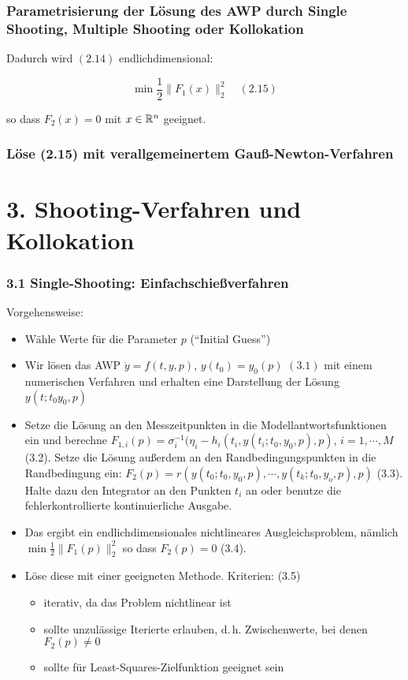 \subsection*{Parametrisierung der Lösung des AWP durch Single Shooting, Multiple Shooting oder Kollokation}

Dadurch wird $(2.14)$ endlichdimensional:

\[ \min \frac 12 \|F_1(x)\|_2^2 \quad (2.15)\]

so dass $F_2(x) = 0$ mit $x \in \mathbb{R}^n$ geeignet.

\subsection*{Löse (2.15) mit verallgemeinertem Gauß-Newton-Verfahren}

\chapter*{3. Shooting-Verfahren und Kollokation}

\subsection*{3.1 Single-Shooting: Einfachschießverfahren}


Vorgehensweise:
\begin{itemize}
\item Wähle Werte für die Parameter $p$ ("`Initial Guess"')
\item Wir lösen das AWP $\dot y = f(t,y,p)$, $y(t_0) = y_0(p)$ $(3.1)$ mit einem numerischen Verfahren und erhalten eine Darstellung der Lösung $y(t; t_0 y_0, p)$
\item Setze die Lösung an den Messzeitpunkten in die Modellantwortsfunktionen ein und berechne $F_{1,i}(p) = \sigma_i^{-1}(\eta_i - h_i(t_i, y(t_i; t_0, y_0, p), p)$, $i=1,\cdots,M$ (3.2). Setze die Lösung außerdem an den Randbedingungspunkten in die Randbedingung ein: $F_2(p) = r(y(t_0; t_0, y_0, p), \cdots, y(t_k; t_0, y_o, p), p)$ (3.3). Halte dazu den Integrator an den Punkten $t_i$ an oder benutze die fehlerkontrollierte kontinuierliche Ausgabe.
\item Das ergibt ein endlichdimensionales nichtlineares Ausgleichsproblem, nämlich $\min \tfrac 12 \|F_1(p)\|_2^2$ so dass $F_2(p) = 0$ (3.4).
\item Löse diese mit einer geeigneten Methode. Kriterien: (3.5)
\begin{itemize}
\item iterativ, da das Problem nichtlinear ist
\item sollte unzulässige Iterierte erlauben, d.\,h. Zwischenwerte, bei denen $F_2(p) \neq 0$
\item sollte für Least-Squares-Zielfunktion geeignet sein
\end{itemize}
\end{itemize}

